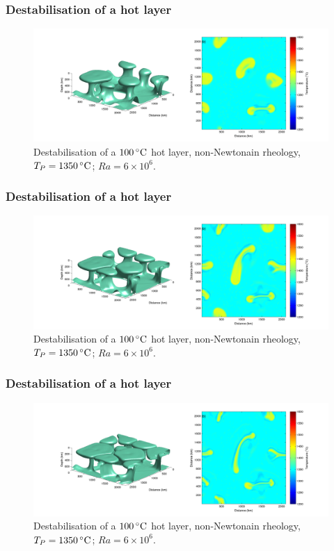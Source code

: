 \documentclass[aspectratio=169]{beamer}
\begin{document}
\begin{frame}
    \frametitle{Destabilisation of a hot layer}
    \begin{figure}
        \vspace{-.5cm}
        \includegraphics[width=0.85\paperwidth]{./figures/100hot/100hotbase_4.png}
        \caption{Destabilisation of a $100\rm\,^{\circ}C$ hot layer, non-Newtonain rheology, $T_{P}=1350\rm\,^{\circ}C$; $Ra = 6\times10^{6}$.}
    \end{figure}
\end{frame}

\begin{frame}
    \frametitle{Destabilisation of a hot layer}
    \begin{figure}
        \vspace{-.5cm}
        \includegraphics[width=0.85\paperwidth]{./figures/100hot/100hotbase_5.png}
        \caption{Destabilisation of a $100\rm\,^{\circ}C$ hot layer, non-Newtonain rheology, $T_{P}=1350\rm\,^{\circ}C$; $Ra = 6\times10^{6}$.}
    \end{figure}
\end{frame}

\begin{frame}
    \frametitle{Destabilisation of a hot layer}
    \begin{figure}
        \vspace{-.5cm}
        \includegraphics[width=0.85\paperwidth]{./figures/100hot/100hotbase_6.png}
        \caption{Destabilisation of a $100\rm\,^{\circ}C$ hot layer, non-Newtonain rheology, $T_{P}=1350\rm\,^{\circ}C$; $Ra = 6\times10^{6}$.}
    \end{figure}
\end{frame}
\end{document}

